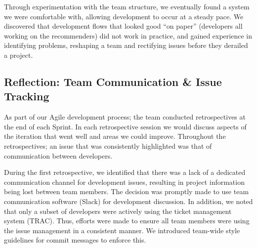 \documentclass{l3proj}
\begin{document}
Through experimentation with the team structure, we eventually found a system we were comfortable with, allowing development to occur at a steady pace. We discovered that development flows that looked good “on paper” (developers all working on the recommenders) did not work in practice, and gained experience in identifying problems, reshaping a team and rectifying issues before they derailed a project. 

\subsection{Reflection: Team Communication \& Issue Tracking}
\label{sec:communication}







As part of our Agile development process; the team conducted retrospectives at the end of each Sprint. In each retrospective session we would discuss aspects of the iteration that went well and areas we could improve. Throughout the retrospectives; an issue that was consistently highlighted was that of communication between developers.

During the first retrospective, we identified that there was a lack of a dedicated communication channel for development issues, resulting in project information being lost between team members. The decision was promptly made to use team communication software (Slack) for development discussion. In addition, we noted that only a subset of developers were actively using the ticket management system (TRAC). Thus, efforts were made to ensure all team members were using the issue management in a consistent manner. We introduced team-wide style guidelines for commit messages to enforce this. 
\end{document}
